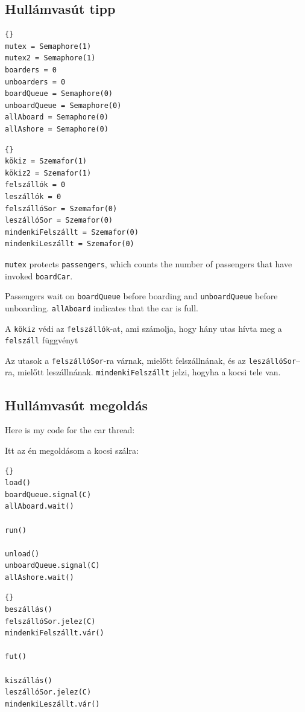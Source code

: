 \documentclass{book}
\newcommand{\clearemptydoublepage}{\newpage\cleardoublepage}
\begin{document}
\clearemptydoublepage
\subsection{Hullámvasút tipp}

\begin{lstlisting}[title={Roller Coaster hint}]{}
mutex = Semaphore(1)
mutex2 = Semaphore(1)
boarders = 0
unboarders = 0
boardQueue = Semaphore(0)
unboardQueue = Semaphore(0)
allAboard = Semaphore(0)
allAshore = Semaphore(0)
\end{lstlisting}

\begin{lstlisting}[title={Hullámvasút tipp}]{}
kökiz = Szemafor(1)
kökiz2 = Szemafor(1)
felszállók = 0
leszállók = 0
felszállóSor = Szemafor(0)
leszállóSor = Szemafor(0)
mindenkiFelszállt = Szemafor(0)
mindenkiLeszállt = Szemafor(0)
\end{lstlisting}

{\tt mutex} protects {\tt passengers}, which counts the number of
passengers that have invoked {\tt boardCar}.  

Passengers wait on {\tt boardQueue} before boarding and
{\tt unboardQueue} before unboarding.  {\tt allAboard}
indicates that the car is full.

A {\tt kökiz} védi az {\tt felszállók}-at, ami számolja, hogy hány
utas hívta meg a {\tt felszáll} függvényt

Az utasok a {\tt felszállóSor}-ra várnak, mielőtt felszállnának, és az
{\tt leszállóSor}–ra, mielőtt leszállnának. {\tt mindenkiFelszállt} jelzi, hogyha a kocsi tele
van.

\clearemptydoublepage
\subsection{Hullámvasút megoldás}

Here is my code for the car thread:

Itt az én megoldásom a kocsi szálra:

\begin{lstlisting}[title={Roller Coaster solution (car)}]{}
load()
boardQueue.signal(C)
allAboard.wait()

run()

unload()
unboardQueue.signal(C)
allAshore.wait()
\end{lstlisting}

\begin{lstlisting}[title={Hullámvasút megoldás (kocsi)}]{}
beszállás()
felszállóSor.jelez(C)
mindenkiFelszállt.vár()

fut()

kiszállás()
leszállóSor.jelez(C)
mindenkiLeszállt.vár()
\end{lstlisting}
\end{document}
